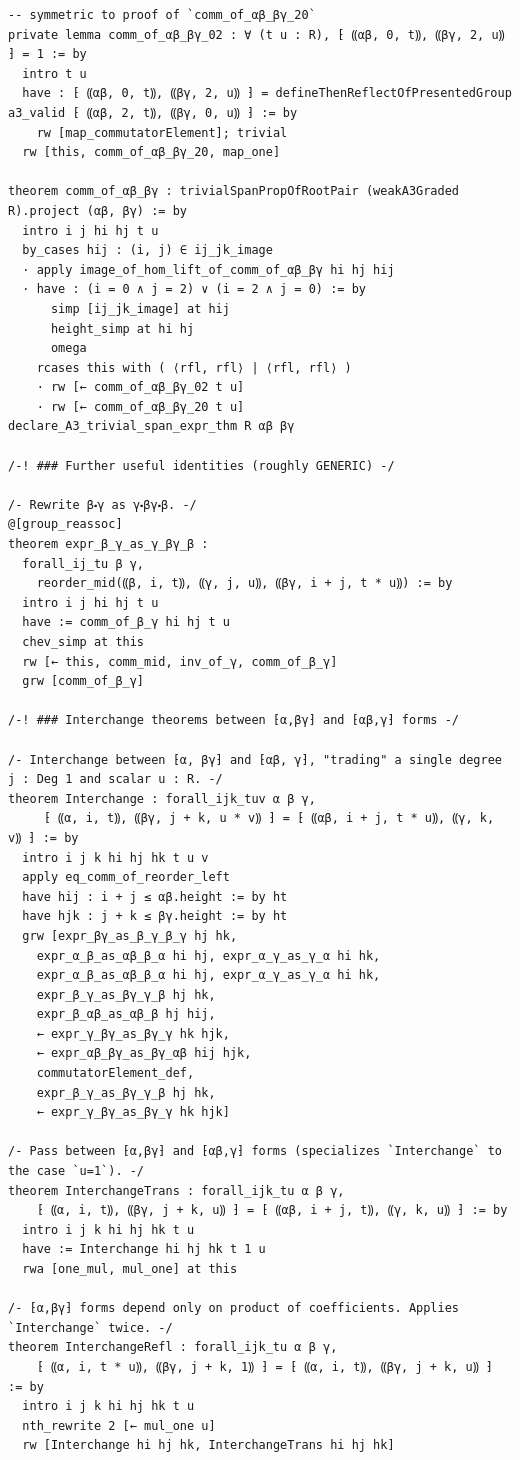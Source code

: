 \begin{Verbatim}
-- symmetric to proof of `comm_of_αβ_βγ_20`
private lemma comm_of_αβ_βγ_02 : ∀ (t u : R), ⁅ ⸨αβ, 0, t⸩, ⸨βγ, 2, u⸩ ⁆ = 1 := by
  intro t u
  have : ⁅ ⸨αβ, 0, t⸩, ⸨βγ, 2, u⸩ ⁆ = defineThenReflectOfPresentedGroup a3_valid ⁅ ⸨αβ, 2, t⸩, ⸨βγ, 0, u⸩ ⁆ := by
    rw [map_commutatorElement]; trivial
  rw [this, comm_of_αβ_βγ_20, map_one]

theorem comm_of_αβ_βγ : trivialSpanPropOfRootPair (weakA3Graded R).project (αβ, βγ) := by
  intro i j hi hj t u
  by_cases hij : (i, j) ∈ ij_jk_image
  · apply image_of_hom_lift_of_comm_of_αβ_βγ hi hj hij
  · have : (i = 0 ∧ j = 2) ∨ (i = 2 ∧ j = 0) := by
      simp [ij_jk_image] at hij
      height_simp at hi hj
      omega
    rcases this with ( ⟨rfl, rfl⟩ | ⟨rfl, rfl⟩ )
    · rw [← comm_of_αβ_βγ_02 t u]
    · rw [← comm_of_αβ_βγ_20 t u]
declare_A3_trivial_span_expr_thm R αβ βγ

/-! ### Further useful identities (roughly GENERIC) -/

/- Rewrite β⬝γ as γ⬝βγ⬝β. -/
@[group_reassoc]
theorem expr_β_γ_as_γ_βγ_β :
  forall_ij_tu β γ,
    reorder_mid(⸨β, i, t⸩, ⸨γ, j, u⸩, ⸨βγ, i + j, t * u⸩) := by
  intro i j hi hj t u
  have := comm_of_β_γ hi hj t u
  chev_simp at this
  rw [← this, comm_mid, inv_of_γ, comm_of_β_γ]
  grw [comm_of_β_γ]

/-! ### Interchange theorems between ⁅α,βγ⁆ and ⁅αβ,γ⁆ forms -/

/- Interchange between ⁅α, βγ⁆ and ⁅αβ, γ⁆, "trading" a single degree j : Deg 1 and scalar u : R. -/
theorem Interchange : forall_ijk_tuv α β γ,
     ⁅ ⸨α, i, t⸩, ⸨βγ, j + k, u * v⸩ ⁆ = ⁅ ⸨αβ, i + j, t * u⸩, ⸨γ, k, v⸩ ⁆ := by
  intro i j k hi hj hk t u v
  apply eq_comm_of_reorder_left
  have hij : i + j ≤ αβ.height := by ht
  have hjk : j + k ≤ βγ.height := by ht
  grw [expr_βγ_as_β_γ_β_γ hj hk,
    expr_α_β_as_αβ_β_α hi hj, expr_α_γ_as_γ_α hi hk,
    expr_α_β_as_αβ_β_α hi hj, expr_α_γ_as_γ_α hi hk,
    expr_β_γ_as_βγ_γ_β hj hk,
    expr_β_αβ_as_αβ_β hj hij,
    ← expr_γ_βγ_as_βγ_γ hk hjk,
    ← expr_αβ_βγ_as_βγ_αβ hij hjk,
    commutatorElement_def,
    expr_β_γ_as_βγ_γ_β hj hk,
    ← expr_γ_βγ_as_βγ_γ hk hjk]

/- Pass between ⁅α,βγ⁆ and ⁅αβ,γ⁆ forms (specializes `Interchange` to the case `u=1`). -/
theorem InterchangeTrans : forall_ijk_tu α β γ,
    ⁅ ⸨α, i, t⸩, ⸨βγ, j + k, u⸩ ⁆ = ⁅ ⸨αβ, i + j, t⸩, ⸨γ, k, u⸩ ⁆ := by
  intro i j k hi hj hk t u
  have := Interchange hi hj hk t 1 u
  rwa [one_mul, mul_one] at this

/- ⁅α,βγ⁆ forms depend only on product of coefficients. Applies `Interchange` twice. -/
theorem InterchangeRefl : forall_ijk_tu α β γ,
    ⁅ ⸨α, i, t * u⸩, ⸨βγ, j + k, 1⸩ ⁆ = ⁅ ⸨α, i, t⸩, ⸨βγ, j + k, u⸩ ⁆ := by
  intro i j k hi hj hk t u
  nth_rewrite 2 [← mul_one u]
  rw [Interchange hi hj hk, InterchangeTrans hi hj hk]


\end{Verbatim}
